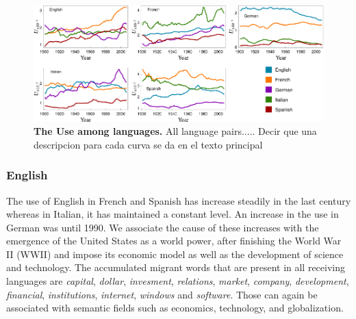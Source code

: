 \documentclass[10pt,letterpaper]{article} %
\begin{document}


\begin{figure}[!h]
	\begin{adjustwidth}{-2cm}{1cm}
		\centering
		\includegraphics{images/usoFinal.pdf}
		\caption{{\bf The Use among languages.}  All language pairs..... Decir que una descripcion para 
cada curva se da en el texto principal}
		\label{fig.UT_art}
	\end{adjustwidth}
\end{figure}
\subsubsection*{English} %

The use of English in French and Spanish has increase steadily in the last century
whereas in Italian, it has maintained a constant level. 
An increase in the use  in German was until 1990. We associate the cause of these increases
with the emergence of the United States as a world power, after finishing the
World War II (WWII) and  impose its economic model as well as the development
of science and
technology. The accumulated migrant words that are present in all receiving
languages are \textit{capital}, \textit{dollar}, \textit{invesment},
\textit{relations}, \textit{market}, \textit{company}, \textit{development},
\textit{financial},  \textit{institutions}, \textit{internet}, \textit{windows}
and \textit{software}. Those can again be associated with semantic fields such
as economics, technology, and globalization.
\end{document}
